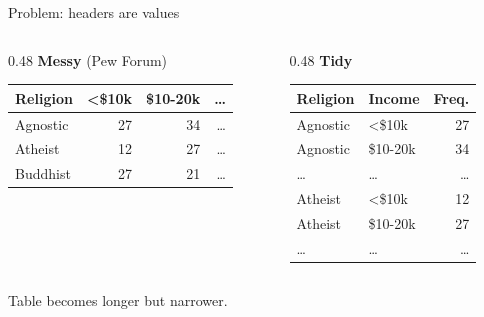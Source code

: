 \begin{frame}{Problem: headers are values}
  \begin{columns}[T]
    \begin{column}{0.48\textwidth}
      \textbf{Messy} (Pew Forum)\\[0.2cm]
      \centering\scriptsize
      \begin{tabular}{lrrr}
        \toprule
        \textbf{Religion} & \textbf{<\$10k} & \textbf{\$10-20k} & \textbf{\dots} \\
        \midrule
        Agnostic & 27 & 34 & \dots \\
        Atheist & 12 & 27 & \dots \\
        Buddhist & 27 & 21 & \dots \\
        \bottomrule
      \end{tabular}
    \end{column}
    \begin{column}{0.48\textwidth}
      \textbf{Tidy}\\[0.2cm]
      \centering\scriptsize
      \begin{tabular}{llr}
        \toprule
        \textbf{Religion} & \textbf{Income} & \textbf{Freq.} \\
        \midrule
        Agnostic & <\$10k & 27 \\
        Agnostic & \$10-20k & 34 \\
        \dots & \dots & \dots \\
        Atheist & <\$10k & 12 \\
        Atheist & \$10-20k & 27 \\
        \dots & \dots & \dots \\
        \bottomrule
      \end{tabular}
    \end{column}
  \end{columns}

  \vspace{0.3cm}
  Table becomes longer but narrower.
\end{frame}

